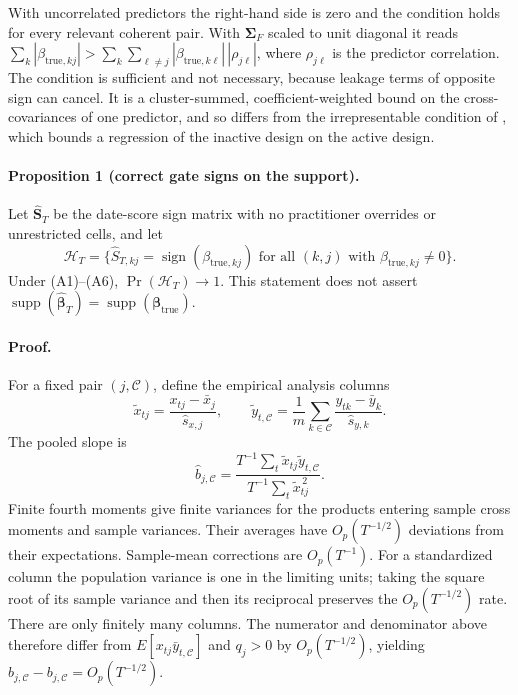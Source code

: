 \documentclass[11pt,a4paper]{article}
\begin{document}
With uncorrelated predictors the right-hand side is zero and the condition
holds for every relevant coherent pair. With $\bm\Sigma_F$ scaled to unit
diagonal it reads $\sum_k|\beta_{\mathrm{true},kj}|
>\sum_k\sum_{\ell\ne j}|\beta_{\mathrm{true},k\ell}|\,|\rho_{j\ell}|$, where
$\rho_{j\ell}$ is the predictor correlation. The condition is sufficient and
not necessary, because leakage terms of opposite sign can cancel. It is a
cluster-summed, coefficient-weighted bound on the cross-covariances of one
predictor, and so differs from the irrepresentable condition of
\citet{Zhao+Yu:2006}, which bounds a regression of the inactive design on the
active design.

\paragraph{Proposition 1 (correct gate signs on the support).}
Let $\widehat{\bm S}_T$ be the date-score sign matrix with no practitioner
overrides or unrestricted cells, and let
\begin{equation}\label{eq:thm-sign}
 \mathcal H_T=
 \{\widehat S_{T,kj}=\operatorname{sign}(\beta_{\mathrm{true},kj})
       \text{ for all }(k,j)\text{ with }\beta_{\mathrm{true},kj}\ne0\}.
\end{equation}
Under (A1)--(A6), $\Pr(\mathcal H_T)\to1$.
This statement does not assert
$\operatorname{supp}(\widehat{\bm\beta}_T)
 =\operatorname{supp}(\bm\beta_{\mathrm{true}})$.

\paragraph{Proof.}
For a fixed pair $(j,\mathcal C)$, define the empirical analysis columns
\[
 \widetilde x_{tj}=\frac{x_{tj}-\bar x_j}{\widehat s_{x,j}},\qquad
 \widetilde y_{t,\mathcal C}=
 \frac{1}{m}\sum_{k\in\mathcal C}
       \frac{y_{tk}-\bar y_k}{\widehat s_{y,k}}.
\]
The pooled slope is
\[
 \widehat b_{j,\mathcal C}
 =\frac{T^{-1}\sum_t\widetilde x_{tj}\widetilde y_{t,\mathcal C}}
        {T^{-1}\sum_t\widetilde x_{tj}^{\,2}}.
\]
Finite fourth moments give finite variances for the products entering
sample cross moments and sample variances. Their averages have
$O_p(T^{-1/2})$ deviations from their expectations. Sample-mean corrections
are $O_p(T^{-1})$. For a standardized column the population variance is one
in the limiting units; taking the square root of its sample variance and
then its reciprocal preserves the $O_p(T^{-1/2})$ rate. There are only
finitely many columns. The numerator and denominator above therefore differ
from $E[x_{tj}\bar y_{t,\mathcal C}]$ and $q_j>0$ by
$O_p(T^{-1/2})$, yielding
$\widehat b_{j,\mathcal C}-b_{j,\mathcal C}=O_p(T^{-1/2})$.
\end{document}
